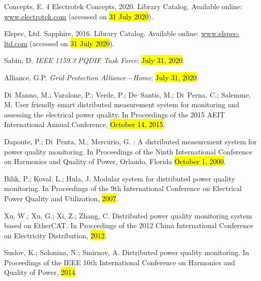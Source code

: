 \documentclass[energies,article,accept,moreauthors,pdftex]{Definitions/mdpi}
\begin{document}
\begin{thebibliography}{999}
Concepts, E.
 4 {\textbar} {Electrotek} {Concepts}, 2020.
\newblock Library Catalog. Available online:  \url{www.electrotek.com}  (accessed on \hl{31 July 2020}).

{Elspec, Ltd}.
 {Sapphire}, 2016.
\newblock Library Catalog. Available online:  \url{www.elspec-ltd.com}  (accessed on \hl{31 July 2020}).

Sabin, D.
\newblock \emph{{IEEE} 1159.3 {PQDIF} {Task} {Force}}; \hl{July 31, 2020}.

Alliance, G.P.
\newblock \emph{Grid {Protection} {Alliance}---{Home}}; \hl{July 31, 2020}.

Di~Manno, M.; Varalone, P.; Verde, P.; De~Santis, M.; Di~Perna, C.; Salemme, M.
\newblock User friendly smart distributed measurement system for monitoring and
assessing the electrical power quality.
\newblock In Proceedings of the 2015 {AEIT} {International} {Annual}
{Conference}, \hl{October 14, 2015}.

Daponte, P.; Di~Penta, M.; Mercurio, G.
: A distributed measurement system for power quality
monitoring.
\newblock In {Proceedings of the } Ninth {International} {Conference} on {Harmonics} and {Quality} of
{Power}, Orlando, Florida \hl{October 1, 2000}.

Bilik, P.; Koval, L.; Hula, J.
\newblock Modular system for distributed power quality monitoring.
\newblock In {Proceedings of the } 9th {International} {Conference} on {Electrical} {Power} {Quality}
and {Utilization}, \hl{2007}.

Xu, W.; Xu, G.; Xi, Z.; Zhang, C.
\newblock Distributed power quality monitoring system based on {EtherCAT}.
\newblock In {Proceedings of the }2012 {China} {International} {Conference} on {Electricity}
{Distribution}, \hl{2012}.

Suslov, K.; Solonina, N.; Smirnov, A.
\newblock Distributed power quality monitoring.
\newblock In {Proceedings of the } {IEEE} 16th {International} {Conference} on {Harmonics} and
{Quality} of {Power}, \hl{2014}.


\end{thebibliography}
\end{document}
